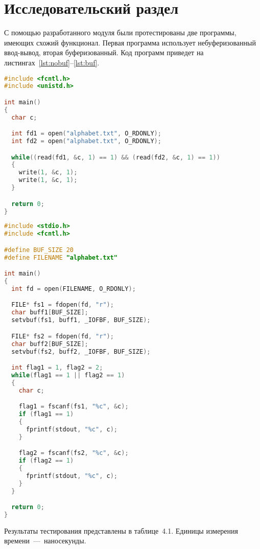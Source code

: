 \chapter{Исследовательский раздел}

С помощью разработанного модуля были протестированы две программы, имеющих схожий функционал. Первая программа использует небуферизованный ввод-вывод, вторая буферизованный. Код программ приведет на листингах~\ref{lst:nobuf}--\ref{lst:buf}.

\begin{lstlisting}[language=C, label=lst:nobuf, caption={Программа, использующая небуферизованный ввод-вывод}]
#include <fcntl.h>
#include <unistd.h>

int main()
{
  char c;    

  int fd1 = open("alphabet.txt", O_RDONLY);
  int fd2 = open("alphabet.txt", O_RDONLY);

  while((read(fd1, &c, 1) == 1) && (read(fd2, &c, 1) == 1))
  {
    write(1, &c, 1);
    write(1, &c, 1);
  }

  return 0;
}
\end{lstlisting}


\begin{lstlisting}[language=C, label=lst:buf, caption={Программа, использующая буферизованный ввод-вывод}]
#include <stdio.h>
#include <fcntl.h>

#define BUF_SIZE 20
#define FILENAME "alphabet.txt"

int main()
{
  int fd = open(FILENAME, O_RDONLY);

  FILE* fs1 = fdopen(fd, "r");
  char buff1[BUF_SIZE];
  setvbuf(fs1, buff1, _IOFBF, BUF_SIZE);

  FILE* fs2 = fdopen(fd, "r");
  char buff2[BUF_SIZE];
  setvbuf(fs2, buff2, _IOFBF, BUF_SIZE);

  int flag1 = 1, flag2 = 2;
  while(flag1 == 1 || flag2 == 1)
  {
    char c;

    flag1 = fscanf(fs1, "%c", &c);
    if (flag1 == 1)
    {
      fprintf(stdout, "%c", c);     
    }

    flag2 = fscanf(fs2, "%c", &c);
    if (flag2 == 1)
    {
      fprintf(stdout, "%c", c); 
    }
  }

  return 0;
}
\end{lstlisting}

\newpage

Результаты тестирования представлены в таблице~4.1. Единицы измерения времени~---~наносекунды.


